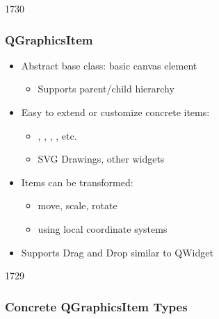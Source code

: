 
\begin{slide}{1730}
\frametitle{QGraphicsItem}
\begin{itemize}

\item Abstract base class: basic canvas element
    \begin{itemize}
    \item Supports parent/child hierarchy
    \end{itemize}
    
\item Easy to extend or customize concrete items:
    \begin{itemize}
    \item {}, , , , etc.
    \item SVG Drawings, other widgets
    \end{itemize}

\item Items can be transformed:
    \begin{itemize}
    \item move, scale, rotate
    \item using local coordinate systems
    \end{itemize}
    
\item Supports Drag and Drop similar to QWidget
\end{itemize}
\end{slide}


\begin{slide}{1729}
\frametitle{Concrete QGraphicsItem Types}
\end{slide}

